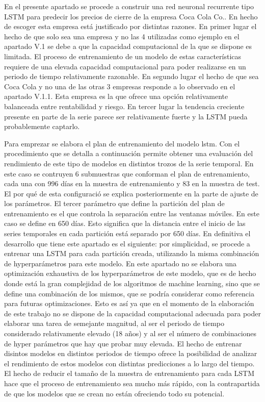 \documentclass[]{article}
\title{}
\author{}
\date{}
\begin{document}
En el presente apartado se procede a construir una red neuronal
recurrente tipo LSTM para predecir los precios de cierre de la empresa
Coca Cola Co.. En hecho de escoger esta empresa está justificado por
distintas razones. En primer lugar el hecho de que solo sea una empresa
y no las 4 utilizadas como ejemplo en el apartado V.1 se debe a que la
capacidad computacional de la que se dispone es limitada. El proceso de
entrenamiento de un modelo de estas características requiere de una
elevada capacidad computacional para poder realizarse en un periodo de
tiempo relativamente razonable. En segundo lugar el hecho de que sea
Coca Cola y no una de las otras 3 empresas responde a lo observado en el
apartado V.1.1. Esta empresa es la que ofrece una opción relativamente
balanceada entre rentabilidad y riesgo. En tercer lugar la tendencia
creciente presente en parte de la serie parece ser relativamente fuerte
y la LSTM pueda probablemente captarlo.

Para emprezar se elabora el plan de entrenamiento del modelo lstm. Con
el procedimiento que se detalla a continuación permite obtener una
evaluación del rendimiento de este tipo de modelos en distintos trozos
de la serie temporal. En este caso se contruyen 6 submuestras que
conforman el plan de entrenamiento, cada una con 996 días en la muestra
de entrenamiento y 83 en la muestra de test. El por qué de esta
configuració se explica posteriormente en la parte de ajuste de los
parámetros. El tercer parámetro que define la partición del plan de
entrenamiento es el que controla la separación entre las ventanas
móviles. En este caso se define en 650 días. Esto significa que la
distancia entre el inicio de las series temporales en cada partición
está separado por 650 días. En definitiva el desarrollo que tiene este
apartado es el siguiente: por simplicidad, se procede a entrenar una
LSTM para cada partición creada, utilizando la misma combinación de
hyperparámetros para este modelo. En este apartado no se elabora una
optimización exhaustiva de los hyperparámetros de este modelo, que es de
hecho donde está la gran complejidad de los algoritmos de machine
learning, sino que se define una combinación de los mismos, que se
podría considerar como referencia para futuras optimizaciones. Esto es
así ya que en el momento de la elaboración de este trabajo no se dispone
de la capacidad computacional adecuada para poder elaborar una tarea de
semejante magnitud, al ser el periodo de tiempo considerado
relativamente elevado (18 años) y al ser el número de combinaciones de
hyper parámetros que hay que probar muy elevada. El hecho de entrenar
disintos modelos en distintos periodos de tiempo ofrece la posibilidad
de analizar el rendimiento de estos modelos con distintas predicciones a
lo largo del tiempo. El hecho de reducir el tamaño de la muestra de
entrenamiento para cada LSTM hace que el proceso de entrenamiento sea
mucho más rápido, con la contrapartida de que los modelos que se crean
no están ofreciendo todo su potencial.
\end{document}
